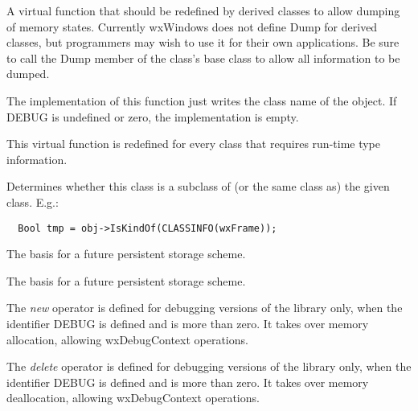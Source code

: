 A virtual function that should be redefined by derived classes to allow dumping of
memory states. Currently wxWindows does not define Dump for derived classes, but
programmers may wish to use it for their own applications. Be sure to
call the Dump member of the class's base class to allow all information to be dumped.

The implementation of this function just writes the class name of the object.
If DEBUG is undefined or zero, the implementation is empty.



This virtual function is redefined for every class that requires run-time
type information.

\label{wxobjectiskindof}


Determines whether this class is a subclass of (or the same class as)
the given class. E.g.:

\begin{verbatim}
  Bool tmp = obj->IsKindOf(CLASSINFO(wxFrame));
\end{verbatim}



The basis for a future persistent storage scheme.



The basis for a future persistent storage scheme.



The {\it new} operator is defined for debugging versions of the library only, when
the identifier DEBUG is defined and is more than zero. It takes over memory allocation, allowing
wxDebugContext operations.



The {\it delete} operator is defined for debugging versions of the library only, when
the identifier DEBUG is defined and is more than zero. It takes over memory deallocation, allowing
wxDebugContext operations.

